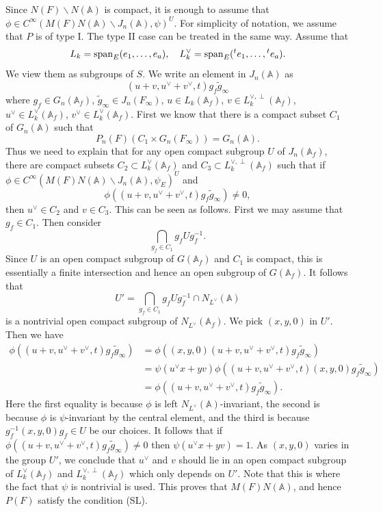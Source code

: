 \documentclass[letterpaper,11pt]{amsart}
\newcommand{\bA}{\mathbb{A}}
\newcommand{\bs}{\backslash}
\newcommand{\<}{\negthickspace}
\newcommand{\tp}[1]{\prescript{t}{}{#1}}
\theoremstyle{definition}
\theoremstyle{plain}
\theoremstyle{remark}
\numberwithin{equation}{section}
\begin{document}
Since $N(F) \bs N(\bA)$ is
compact, it is enough to assume that $\phi \in C^\infty(M(F)N(\bA) \bs J_n(\bA), \psi)^U$. For simplicity of notation, we assume that $P$ is of
type I. The type II case can be treated in the same way. Assume that
    \[
    L_k = \mathrm{span}_E(e_1, \hdots, e_a), \quad
    L_{k}^\vee = \mathrm{span}_E(\tp{e_1}, \hdots, \tp{e_a}).
    \]
We view them as subgroups of $S$.  We write an element in $J_n(\bA)$ as
    \[
     (u+v, u^\vee+v^\vee, t) g_f \widetilde{g}_\infty
    \]
where $g_f \in G_n(\bA_f)$, $\widetilde{g}_{\infty} \in J_n(F_\infty)$,
$u \in L_k(\bA_f)$, $v \in L_k^{\vee, \perp}(\bA_f)$,
$u^\vee \in L_k^\vee(\bA_f)$, $v^\vee
\in L_k^\vee(\bA_f)$. First we know that there is a compact subset $C_1$ of
$G_n(\bA)$ such that
    \[
    P_n(F) (C_1 \times G_n(F_\infty)) = G_n(\bA).
    \]
Thus we need to explain that for any open compact subgroup $U$ of $J_n(\bA_f)$,
there are compact subsets $C_2 \subset
L_k^\vee(\bA_f)$ and $C_3 \subset L_{k}^{\vee, \perp}(\bA_f)$ such that if
$\phi \in C^\infty(M(F)N(\bA) \bs J_n(\bA), \psi_E)^U$ and
    \[
    \phi(  (u+v, u^\vee+v^\vee, t) g_f \widetilde{g}_\infty) \not=0,
    \]
then $u^\vee \in C_2$ and $v \in C_3$. This can be seen as follows. First we may assume
that $g_f \in C_1$. Then consider
    \[
    \bigcap_{g_f \in C_1} g_f U g_f^{-1}.
    \]
Since $U$ is an open compact subgroup of $G(\bA_f)$ and $C_1$ is compact, this is
essentially a finite intersection and hence an open subgroup of $G(\bA_f)$. It follows that
    \[
    U' = \bigcap_{g_f \in C_1} g_f U g_f^{-1} \cap N_{L^\vee}(\bA)
    \]
is a nontrivial open compact subgroup of  $N_{L^\vee}(\bA_f)$.
We pick $(x, y, 0)$ in $U'$. Then we have
    \[
    \begin{aligned}
    \phi((u+v, u^\vee+v^\vee, t) g_f \widetilde{g}_\infty ) &=
    \phi((x, y, 0) (u+v, u^\vee+v^\vee, t)  g_f \widetilde{g}_\infty) \\
    &=
    \psi(u^\vee x + y v) \phi( (u+v, u^\vee+v^\vee, t) (x, y, 0) g_f \widetilde{g}_\infty)\\
    & =
    \phi( (u+v, u^\vee+v^\vee, t) g_f \widetilde{g}_\infty).
    \end{aligned}
    \]
Here the first equality is because $\phi$ is left $N_{L^\vee}(\bA)$-invariant, the second is
because $\phi$ is $\psi$-invariant by the central element, and the third is because
$g_f^{-1} (x, y, 0) g_f \in U$ be our choices. It follows that if
$\phi( (u+v, u^\vee+v^\vee, t) g_f \widetilde{g}_\infty) \not=0$ then $\psi(u^\vee x + y v)  = 1$.
As $(x, y, 0)$ varies in  the group $U'$, we conclude that $u^\vee$ and $v$ should lie
in an open compact subgroup of $L_k^\vee(\bA_f)$ and $L_k^{\vee, \perp}(\bA_f)$ which only depends
on $U'$. Note that this is where the fact that $\psi$ is nontrivial is used.
This proves that $M(F)N(\bA)$, and hence $P(F)$ satisfy the condition (SL).
\end{document}
